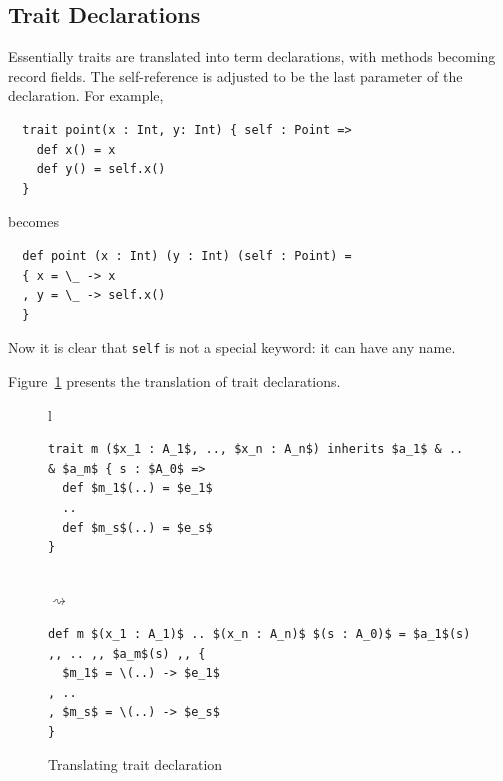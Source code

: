 \subsection{Trait Declarations}

Essentially traits are translated into term declarations, with methods becoming
record fields. The self-reference is adjusted to be the last parameter of the
declaration. For example,
\begin{lstlisting}
  trait point(x : Int, y: Int) { self : Point =>
    def x() = x
    def y() = self.x()
  }
\end{lstlisting}
becomes
\begin{lstlisting}
  def point (x : Int) (y : Int) (self : Point) =
  { x = \_ -> x
  , y = \_ -> self.x()
  }
\end{lstlisting}
Now it is clear that \lstinline{self} is not a special keyword: it can
have any name.

Figure~\ref{fig:trans-trait} presents the translation of trait declarations.


\begin{figure}[t]
  \centering
  \begin{tabular}{l}

\begin{lstlisting}[mathescape=true]
trait m ($x_1 : A_1$, .., $x_n : A_n$) inherits $a_1$ & .. & $a_m$ { s : $A_0$ =>
  def $m_1$(..) = $e_1$
  ..
  def $m_s$(..) = $e_s$
}
\end{lstlisting} \\

    $\rightsquigarrow$ \\

\begin{lstlisting}[mathescape=true]
def m $(x_1 : A_1)$ .. $(x_n : A_n)$ $(s : A_0)$ = $a_1$(s) ,, .. ,, $a_m$(s) ,, {
  $m_1$ = \(..) -> $e_1$
, ..
, $m_s$ = \(..) -> $e_s$
}
\end{lstlisting}
  \end{tabular}
\caption{Translating trait declaration}
\label{fig:trans-trait}

\end{figure}

